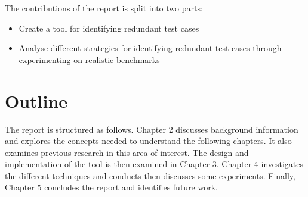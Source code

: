 The contributions of the report is split into two parts: 

\begin{itemize}
\item Create a tool for identifying redundant test cases
\item Analyse different strategies for identifying redundant test cases through experimenting on realistic benchmarks
\end{itemize}

\section{Outline}

The report is structured as follows. Chapter 2 discusses background information and explores the concepts needed to understand the following chapters. It also examines previous research in this area of interest. The design and implementation of the tool is then examined in Chapter 3. Chapter 4 investigates the different techniques and conducts then discusses some experiments. Finally, Chapter 5 concludes the report and identifies future work.